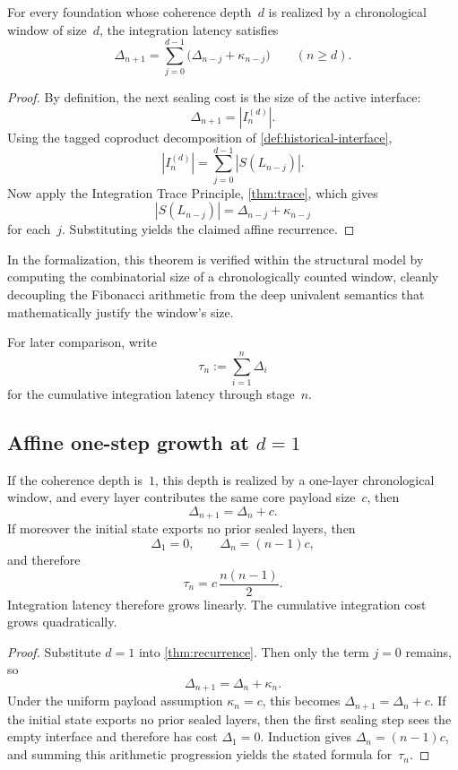 \documentclass{lmcs}
\begin{document}
\begin{thm}
\label{thm:recurrence}
For every foundation whose coherence depth~$d$ is realized by a chronological window of size~$d$, the integration latency satisfies
\[
  \Delta_{n+1} = \sum_{j=0}^{d-1} \bigl(\Delta_{n-j} + \kappa_{n-j}\bigr)
  \qquad
  (n \geq d).
\]
\end{thm}

\begin{proof}
By definition, the next sealing cost is the size of the active interface:
\[
  \Delta_{n+1} = |I_n^{(d)}|.
\]
Using the tagged coproduct decomposition of \autoref{def:historical-interface},
\[
  |I_n^{(d)}|
  =
  \sum_{j=0}^{d-1} |S(L_{n-j})|.
\]
Now apply the Integration Trace Principle, \autoref{thm:trace}, which gives
\[
  |S(L_{n-j})| = \Delta_{n-j} + \kappa_{n-j}
\]
for each~$j$. Substituting yields the claimed affine recurrence.
\end{proof}

\begin{rem}
In the formalization, this theorem is verified within the structural model by computing the combinatorial size of a chronologically counted window, cleanly decoupling the Fibonacci arithmetic from the deep univalent semantics that mathematically justify the window's size.
\end{rem}

For later comparison, write
\[
  \tau_n := \sum_{i=1}^n \Delta_i
\]
for the cumulative integration latency through stage~$n$.

\subsection{\texorpdfstring{Affine one-step growth at $d=1$}{Affine one-step growth at d=1}}

\begin{cor}
\label{cor:d1}
If the coherence depth is~$1$, this depth is realized by a one-layer chronological window, and every layer contributes the same core payload size~$c$, then
\[
  \Delta_{n+1} = \Delta_n + c.
\]
If moreover the initial state exports no prior sealed layers, then
\[
  \Delta_1 = 0,
  \qquad
  \Delta_n = (n-1)c,
\]
and therefore
\[
  \tau_n = c\,\frac{n(n-1)}{2}.
\]
Integration latency therefore grows linearly. The cumulative integration cost grows quadratically.
\end{cor}

\begin{proof}
Substitute $d=1$ into \autoref{thm:recurrence}. Then only the term $j=0$ remains, so
\[
  \Delta_{n+1} = \Delta_n + \kappa_n.
\]
Under the uniform payload assumption $\kappa_n=c$, this becomes $\Delta_{n+1}=\Delta_n+c$. If the initial state exports no prior sealed layers, then the first sealing step sees the empty interface and therefore has cost $\Delta_1=0$. Induction gives $\Delta_n=(n-1)c$, and summing this arithmetic progression yields the stated formula for~$\tau_n$.
\end{proof}
\end{document}
